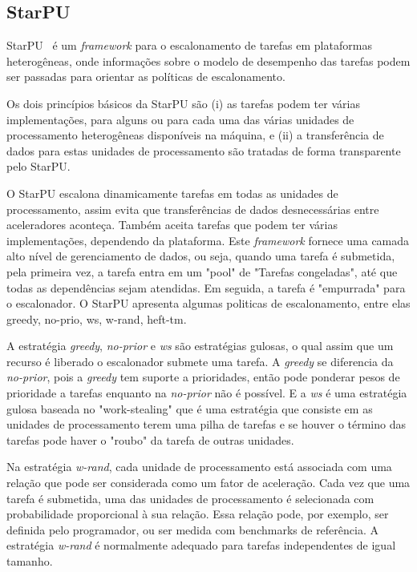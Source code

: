 \subsection{StarPU}

 StarPU~\citep{starpu} é um \textit{framework} para o escalonamento de tarefas em
plataformas heterogêneas, onde informações sobre o modelo de desempenho das
tarefas podem ser passadas para orientar as políticas de escalonamento. 

Os dois princípios básicos da StarPU são (i) as tarefas podem ter várias implementações,
para alguns ou para cada uma das várias unidades de processamento heterogêneas
disponíveis na máquina, e (ii) a transferência de dados para estas unidades de
processamento são tratadas de forma transparente pelo StarPU. 

O StarPU escalona dinamicamente tarefas em todas as unidades de processamento, assim evita que  transferências de dados desnecessárias entre aceleradores aconteça. Também aceita tarefas que podem ter várias implementações, dependendo da plataforma. Este \textit{framework} fornece uma camada alto nível de gerenciamento de dados, ou seja, quando uma tarefa é submetida, pela primeira vez, a tarefa entra em um "pool" de "Tarefas congeladas", até que todas as dependências sejam atendidas. Em seguida, a tarefa é "empurrada" para o escalonador. O StarPU apresenta algumas politicas de escalonamento, entre elas greedy, no-prio, ws, w-rand, heft-tm. 

A estratégia \textit{greedy}, \textit{no-prior} e \textit{ws} são estratégias gulosas, o qual assim que um recurso é liberado o escalonador submete uma tarefa. A \textit{greedy} se diferencia da \textit{no-prior}, pois a \textit{greedy} tem suporte a prioridades, então pode ponderar pesos de prioridade a tarefas enquanto na \textit{no-prior} não é possível. E a \textit{ws} é uma estratégia gulosa baseada no "work-stealing" que é uma estratégia que consiste em as unidades de processamento terem uma pilha de tarefas e se houver o término das tarefas pode haver o "roubo" da tarefa de outras unidades. 

Na estratégia \textit{w-rand}, cada unidade de processamento está associada com uma relação que pode ser considerada como um fator de aceleração. Cada vez que uma tarefa é submetida, uma das unidades de processamento é selecionada com probabilidade proporcional à sua relação. Essa relação pode, por exemplo, ser definida pelo programador, ou ser medida com benchmarks de referência. A estratégia \textit{w-rand} é normalmente adequado para tarefas independentes de igual tamanho.

